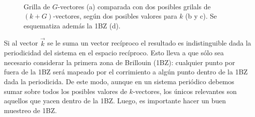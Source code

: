 \begin{figure}[H]
         \\
        \caption{Grilla de $G$-vectores (a) comparada con dos posibles grilals de $(k+G)$-vectores, según dos posibles valores para $k$ (b y c). Se esquematiza además la 1BZ (d).}
        \label{fig:kg}
    \end{figure}

  Si al vector $\vec{k}$ se le suma un vector recíproco el resultado es indistinguible dada la periodicidad del sistema en el espacio recíproco. Esto lleva a que sólo sea necesario considerar la primera zona de Brillouin (1BZ): cualquier punto por fuera de la 1BZ será mapeado por el corrimiento a algún punto dentro de la 1BZ dada la periodicida. De este modo, aunque en un sistema periódico debemos sumar sobre todos los posibles valores de $k$-vectores, los únicos relevantes son aquellos que yacen dentro de la 1BZ. Luego, es importante hacer un buen muestreo de 1BZ.

